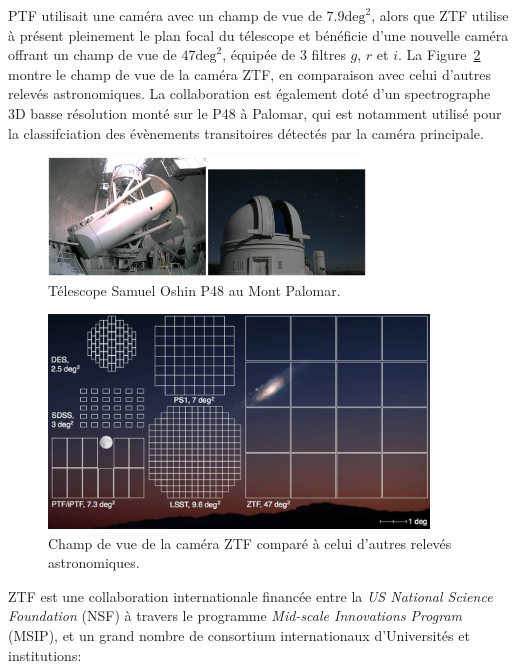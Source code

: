 \documentclass[../main/main.tex]{subfiles}
\begin{document}
PTF utilisait une caméra avec un champ de vue de $7.9 \text{deg}^{2}$,
alors que ZTF utilise à présent pleinement le plan focal du télescope et
bénéficie d'une nouvelle caméra offrant un champ de vue de $47
\text{deg}^{2}$, équipée de 3 filtres $g$, $r$ et $i$. La
Figure~\ref{fig:ztfcamerafov} montre le champ de vue de la caméra ZTF,
en comparaison avec celui d'autres relevés astronomiques. La collaboration est également doté d'un spectrographe
3D basse résolution \citep[$R\approx100$;][]{SEDM18} monté sur le P48 à
Palomar, qui est notamment
utilisé pour la classifciation des évènements transitoires détectés par la caméra principale.

\begin{figure}[h]
  \centering
  \includegraphics[width=0.75\textwidth]{../figures/02_ztf/p48.png}
  \caption{Télescope Samuel Oshin P48 au Mont Palomar.}
  \label{fig:p48}
\end{figure}


\begin{figure}[h]
\centering
\includegraphics[width=0.9\textwidth]{../figures/02_ztf/ztfcamerafov.png}
\caption{Champ de vue de la caméra ZTF comparé à celui d'autres relevés astronomiques.}
\label{fig:ztfcamerafov}
\end{figure}

ZTF est une collaboration internationale financée entre
la \textit{US National Science Foundation} (NSF) à travers le programme \textit{Mid-scale
Innovations Program} (MSIP), et un grand nombre de consortium
internationaux d'Universités et institutions:
\end{document}
